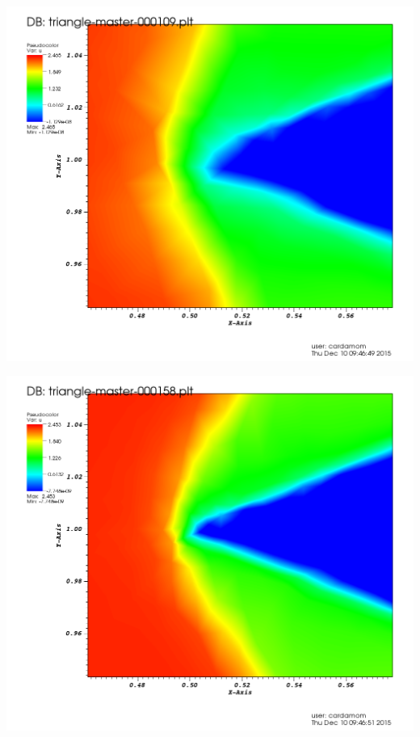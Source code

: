 \begingroup
	\begin{minipage}[t]{.5\linewidth}
		\centering
		\includegraphics[scale=.2]{Bordeaux/figures/AdapPhysique/Plot4bI0B.png}
	\end{minipage}
	\begin{minipage}[t]{.5\linewidth}
		\centering
		\includegraphics[scale=.2]{Bordeaux/figures/AdapPhysique/Plot4bI1B.png}
	\end{minipage}
